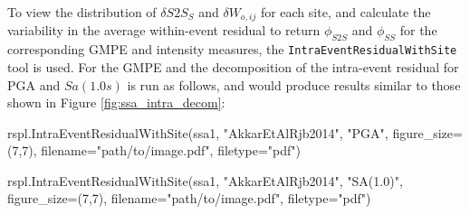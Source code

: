 To view the distribution of $\delta S2S_S$ and $\delta W_{o,ij}$ for each site, and calculate the variability in the average within-event residual to return $\phi_{S2S}$ and $\phi_{SS}$ for the corresponding GMPE and intensity measures, the \verb=IntraEventResidualWithSite= tool is used. For the \cite{Akkar_etal2014} GMPE and the decomposition of the intra-event residual for PGA and $Sa \left( {1.0s} \right)$ is run as follows, and would produce results similar to those shown in Figure \ref{fig:ssa_intra_decom}:

\begin{python}
rspl.IntraEventResidualWithSite(ssa1,
                                "AkkarEtAlRjb2014",
                                "PGA",
                                figure_size=(7,7),
                                filename="path/to/image.pdf",
                                filetype="pdf")
                                
rspl.IntraEventResidualWithSite(ssa1,
                                "AkkarEtAlRjb2014",
                                "SA(1.0)",
                                figure_size=(7,7),
                                filename="path/to/image.pdf",
                                filetype="pdf")
\end{python}


